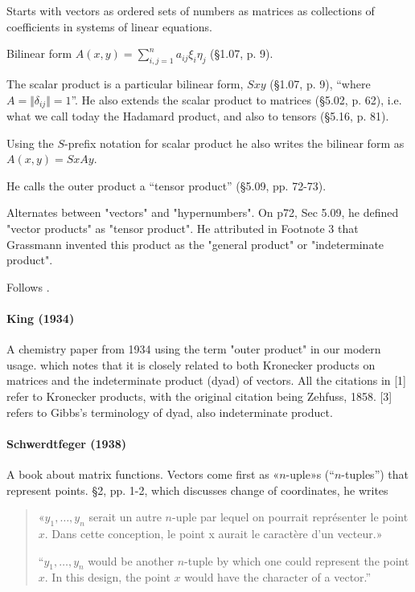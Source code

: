Starts with vectors as ordered sets of numbers as matrices as collections of coefficients in systems of linear equations.

Bilinear form $A(x, y) = \sum^n_{i,j=1} a_{ij} \xi_i \eta_j $ (\S 1.07, p. 9).

The scalar product is a particular bilinear form, $S x y$ (\S 1.07, p. 9), ``where $A = \Vert \delta_{ij} \Vert = 1$''. He also extends the scalar product to matrices (\S 5.02, p. 62), i.e. what we call today the Hadamard product, and also to tensors (\S 5.16, p. 81).

Using the $S$-prefix notation for scalar product he also writes the bilinear form as $A(x, y) = SxAy$.

He calls the outer product a ``tensor product'' (\S 5.09, pp. 72-73).

Alternates between "vectors"
and "hypernumbers". On p72, Sec 5.09, he defined "vector products" as
"tensor product". He attributed in Footnote 3 that Grassmann invented
this product as the "general product" or "indeterminate product".

Follows \cite{Scheffers1889}.



\paragraph{King (1934)}

A chemistry paper from 1934 using the term "outer product" in
our modern usage. which notes that it is closely related to both Kronecker products on
matrices and the indeterminate product (dyad) of vectors. All the
citations in [1] refer to Kronecker products, with the original
citation being Zehfuss, 1858. [3] refers to Gibbs's terminology of
dyad, also indeterminate product.

\paragraph{Schwerdtfeger (1938)~\cite{Schwerdtfeger1938}}

A book about matrix functions.
Vectors come first as «$n$-uple»s (``$n$-tuples'') that represent points. \S 2, pp. 1-2, which discusses change of coordinates, he writes
\begin{quote}
«$y_1, \dots, y_n$ serait un autre $n$-uple par lequel on pourrait représenter le point $x$. Dans cette conception, le point x aurait le caractère d'un vecteur.»

``$y_1, \dots, y_n$ would be another $n$-tuple by which one could represent the point $x$. In this design, the point $x$ would have the character of a vector.''
\end{quote}

